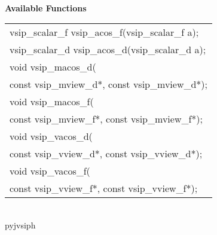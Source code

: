 \\\cvsiplh
\newline \hspace*{.8cm} \vspace*{.1cm} \textbf{Available Functions }
\newline \hspace*{1.1cm} {
\ttfamily
\begin{tabular}[H]{l}
vsip\_scalar\_f vsip\_acos\_f(vsip\_scalar\_f a);\\
vsip\_scalar\_d vsip\_acos\_d(vsip\_scalar\_d a);\\
void vsip\_macos\_d(\\*
\hspace{1cm}const vsip\_mview\_d*, const vsip\_mview\_d*);\\
void vsip\_macos\_f(\\*
\hspace{1cm}const vsip\_mview\_f*, const vsip\_mview\_f*);\\
void vsip\_vacos\_d(\\*
\hspace{1cm}const vsip\_vview\_d*, const vsip\_vview\_d*);\\
void vsip\_vacos\_f(\\*
\hspace{1cm}const vsip\_vview\_f*, const vsip\_vview\_f*);\\
\end{tabular}
}
\\pyjvsiph
{}
